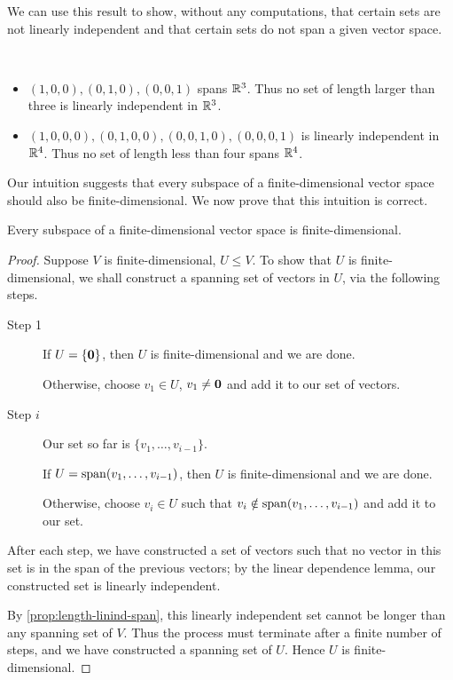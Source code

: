 We can use this result to show, without any computations, that certain sets are not linearly independent and that certain sets do not span a given vector space.

\begin{example} \
\begin{itemize}
\item $(1,0,0), (0,1,0), (0,0,1)$ spans $\mathbb R^3$. Thus no set of length larger than three is linearly independent in $\mathbb R^3$.
\item $(1,0,0,0), (0,1,0,0), (0,0,1,0), (0,0,0,1)$ is linearly independent in $\mathbb R^4$. Thus no set of length less than four spans $\mathbb R^4$.
\end{itemize}
\end{example}

Our intuition suggests that every subspace of a finite-dimensional vector space should also be finite-dimensional. We now prove that this intuition is correct.

\begin{proposition}\label{prop:subspace-finite-dim}
Every subspace of a finite-dimensional vector space is finite-dimensional.
\end{proposition}

\begin{proof}
Suppose $V$ is finite-dimensional, $U\le V$. To show that $U$ is finite-dimensional, we shall construct a spanning set of vectors in $U$, via the following steps.

\begin{description}
\item[Step 1] If $U=\{\vb{0}\}$, then $U$ is finite-dimensional and we are done. 

Otherwise, choose $v_1\in U$, $v_1\neq\vb{0}$ and add it to our set of vectors.

\item[Step $i$] Our set so far is $\{v_1,\dots,v_{i-1}\}$. 

If $U=\operatorname{span}(v_1,\dots,v_{i-1})$, then $U$ is finite-dimensional and we are done. 

Otherwise, choose $v_i\in U$ such that $v_i\notin\operatorname{span}(v_1,\dots,v_{i-1})$ and add it to our set.
\end{description}

After each step, we have constructed a set of vectors such that no vector in this set is in the span of the previous vectors; by the linear dependence lemma, our constructed set is linearly independent.

By \ref{prop:length-linind-span}, this linearly independent set cannot be longer than any spanning set of $V$. Thus the process must terminate after a finite number of steps, and we have constructed a spanning set of $U$. Hence $U$ is finite-dimensional.
\end{proof}
\pagebreak

